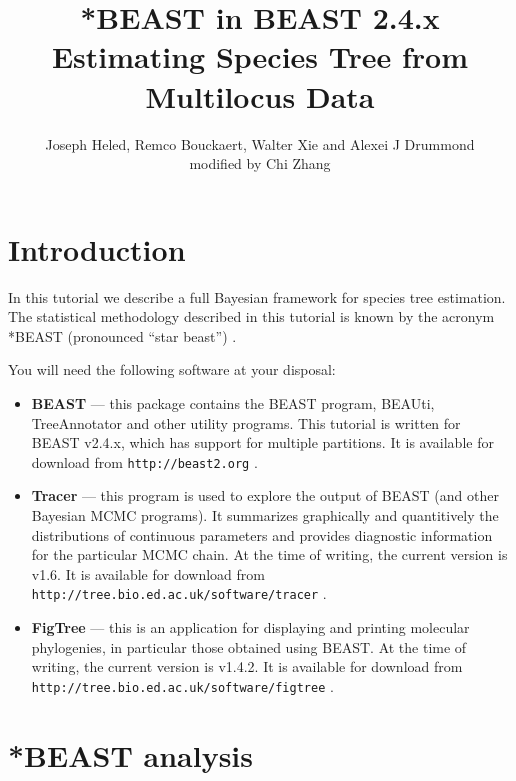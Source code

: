 \documentclass{article}
\newcommand{\BEASTVersion}{2.4.x}
\newcommand{\TracerVersion}{1.6}
\newcommand{\FigTreeVersion}{1.4.2}
\begin{document}
\title{*BEAST in BEAST {\BEASTVersion}\\ Estimating Species Tree from Multilocus Data}

\author{Joseph Heled, Remco Bouckaert, Walter Xie and Alexei J Drummond  \\ modified by Chi Zhang}

\maketitle

\section{Introduction}

In this tutorial we describe a full Bayesian framework for species tree estimation. The statistical methodology described in this tutorial is known by the acronym *BEAST (pronounced ``star beast'') \cite{Heled:2010fk}.

You will need the following software at your disposal:

\begin{itemize}

\item {\bf BEAST} --- this package contains the BEAST program, BEAUti, TreeAnnotator and other utility programs. This tutorial is written for BEAST v{\BEASTVersion}, which has support for multiple partitions. It is available for download from \texttt{http://beast2.org} \cite{beast}.
\item {\bf Tracer} --- this program is used to explore the output of BEAST (and other Bayesian MCMC programs). It summarizes graphically and
quantitively the distributions of continuous parameters and provides diagnostic information for the particular MCMC chain. At the time of
writing, the current version is v{\TracerVersion}. It is available for download from \\
\texttt{http://tree.bio.ed.ac.uk/software/tracer} .
\item {\bf FigTree} --- this is an application for displaying and printing molecular phylogenies, in particular those obtained using
BEAST. At the time of writing, the current version is v{\FigTreeVersion}. It is available for download from \texttt{http://tree.bio.ed.ac.uk/software/figtree} .
\end{itemize}

\section{*BEAST analysis}
\end{document}
